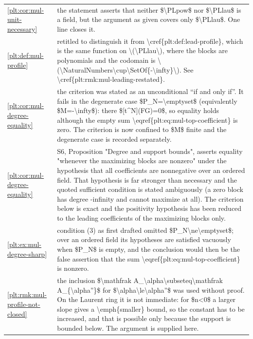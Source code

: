 \documentclass[11pt,oneside]{article}
\theoremstyle{plain}
\theoremstyle{definition}
\theoremstyle{remark}
\begin{document}
\begin{longtable}{@{}p{} p{}@{}}
\cref{plt:cor:mul-unit-necessary} & the statement asserts that neither \$\textbackslash PLpow\$ nor \$\textbackslash PLlau\$ is a field, but the argument as given covers only \$\textbackslash PLlau\$. One line closes it.\\
\cref{plt:def:mul-profile} & retitled to distinguish it from \textbackslash cref\{plt:def:lead-profile\}, which is the same function on \textbackslash (\textbackslash PLlau\textbackslash ), where the blocks are polynomials and the codomain is \textbackslash (\textbackslash NaturalNumbers\textbackslash cup\textbackslash SetOf\{-\textbackslash infty\}\textbackslash ). See \textbackslash cref\{plt:rmk:mul-leading-restated\}.\\
\cref{plt:cor:mul-degree-equality} & the criterion was stated as an unconditional ``if and only if''. It fails in the degenerate case \$P\_N=\textbackslash emptyset\$ (equivalently \$M=-\textbackslash infty\$): there \$[t\textasciicircum N](FG)=0\$, so equality holds although the empty sum \textbackslash eqref\{plt:eq:mul-top-coefficient\} is zero. The criterion is now confined to \$M\$ finite and the degenerate case is recorded separately.\\
\cref{plt:cor:mul-degree-equality} & S6, Proposition "Degree and support bounds", asserts equality "whenever the maximizing blocks are nonzero" under the hypothesis that all coefficients are nonnegative over an ordered field. That hypothesis is far stronger than necessary and the quoted sufficient condition is stated ambiguously (a zero block has degree -infinity and cannot maximize at all). The criterion below is exact and the positivity hypothesis has been reduced to the leading coefficients of the maximizing blocks only.\\
\cref{plt:ex:mul-degree-sharp} & condition (3) as first drafted omitted \$P\_N\textbackslash ne\textbackslash emptyset\$; over an ordered field its hypotheses are satisfied vacuously when \$P\_N\$ is empty, and the conclusion would then be the false assertion that the sum \textbackslash eqref\{plt:eq:mul-top-coefficient\} is nonzero.\\
\cref{plt:rmk:mul-profile-not-closed} & the inclusion \$\textbackslash mathfrak A\_\textbackslash alpha\textbackslash subseteq\textbackslash mathfrak A\_\{\textbackslash alpha''\}\$ for \$\textbackslash alpha\textbackslash le\textbackslash alpha''\$ was used without proof. On the Laurent ring it is not immediate: for \$n<0\$ a larger slope gives a \textbackslash emph\{smaller\} bound, so the constant has to be increased, and that is possible only because the support is bounded below. The argument is supplied here.\\

\end{longtable}
\end{document}
